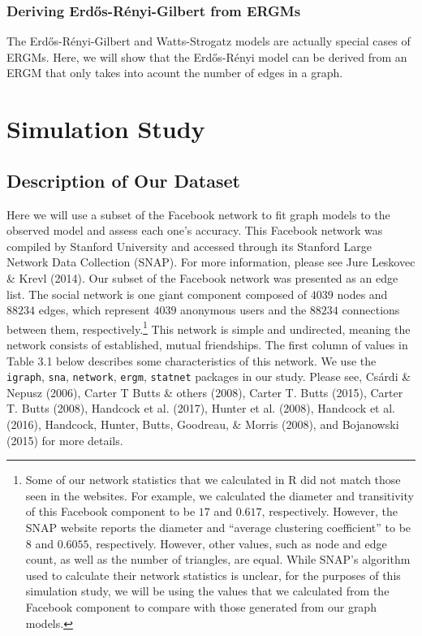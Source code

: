 \documentclass[12pt,twoside]{amherstthesis}
\begin{document}
  \subsection{Deriving Erdős-Rényi-Gilbert from
  ERGMs}\label{deriving-erdos-renyi-gilbert-from-ergms}
  
  The Erdős-Rényi-Gilbert and Watts-Strogatz models are actually special
  cases of ERGMs. Here, we will show that the Erdős-Rényi model can be
  derived from an ERGM that only takes into acount the number of edges in
  a graph.
  
  \chapter{Simulation Study}\label{simulation-study}
  
  \section{Description of Our Dataset}\label{description-of-our-dataset}
  
  Here we will use a subset of the Facebook network to fit graph models to
  the observed model and assess each one's accuracy. This Facebook network
  was compiled by Stanford University and accessed through its Stanford
  Large Network Data Collection (SNAP). For more information, please see
  Jure Leskovec \& Krevl (2014). Our subset of the Facebook network was
  presented as an edge list. The social network is one giant component
  composed of \(4039\) nodes and \(88234\) edges, which represent \(4039\)
  anonymous users and the \(88234\) connections between them,
  respectively.\footnote{Some of our network statistics that we calculated
    in R did not match those seen in the websites. For example, we
    calculated the diameter and transitivity of this Facebook component to
    be \(17\) and \(0.617\), respectively. However, the SNAP website
    reports the diameter and ``average clustering coefficient'' to be
    \(8\) and \(0.6055\), respectively. However, other values, such as
    node and edge count, as well as the number of triangles, are equal.
    While SNAP's algorithm used to calculate their network statistics is
    unclear, for the purposes of this simulation study, we will be using
    the values that we calculated from the Facebook component to compare
    with those generated from our graph models.} This network is simple
  and undirected, meaning the network consists of established, mutual
  friendships. The first column of values in Table 3.1 below describes
  some characteristics of this network. We use the \texttt{igraph},
  \texttt{sna}, \texttt{network}, \texttt{ergm}, \texttt{statnet} packages
  in our study. Please see, Csárdi \& Nepusz (2006), Carter T Butts \&
  others (2008), Carter T. Butts (2015), Carter T. Butts (2008), Handcock
  et al. (2017), Hunter et al. (2008), Handcock et al. (2016), Handcock,
  Hunter, Butts, Goodreau, \& Morris (2008), and Bojanowski (2015) for
  more details.
  
\end{document}

